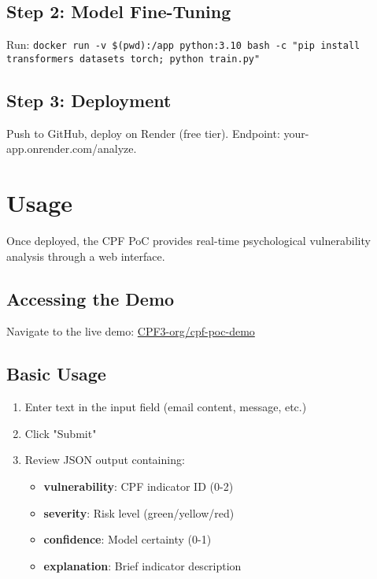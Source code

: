 \documentclass[11pt,a4paper]{article}
\begin{document}
\subsection{Step 2: Model Fine-Tuning}

Run: \texttt{docker run -v \$(pwd):/app python:3.10 bash -c "pip install transformers datasets torch; python train.py"}

\subsection{Step 3: Deployment}

Push to GitHub, deploy on Render (free tier). Endpoint: your-app.onrender.com/analyze.

\section{Usage}

Once deployed, the CPF PoC provides real-time psychological vulnerability analysis through a web interface.

\subsection{Accessing the Demo}

Navigate to the live demo: \href{https://huggingface.co/spaces/CPF3-org/cpf-poc-demo}{CPF3-org/cpf-poc-demo}

\subsection{Basic Usage}

\begin{enumerate}
\item Enter text in the input field (email content, message, etc.)
\item Click "Submit" 
\item Review JSON output containing:
\begin{itemize}
\item \textbf{vulnerability}: CPF indicator ID (0-2)
\item \textbf{severity}: Risk level (green/yellow/red)  
\item \textbf{confidence}: Model certainty (0-1)
\item \textbf{explanation}: Brief indicator description
\end{itemize}
\end{enumerate}
\end{document}
